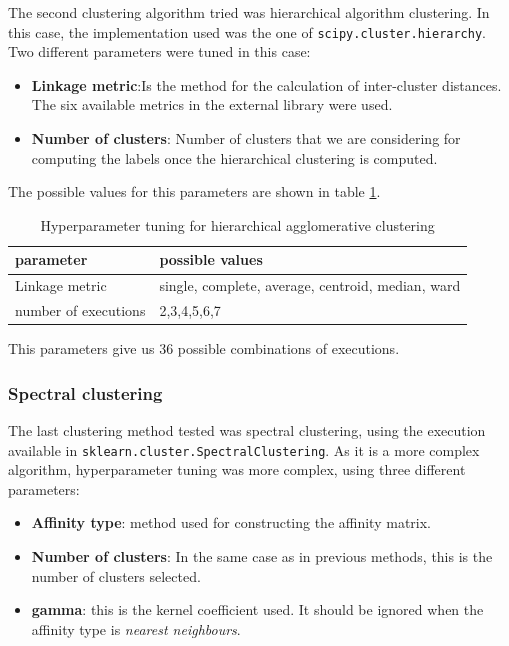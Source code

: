 \documentclass[12pt]{article}
\begin{document}
The second clustering algorithm tried was hierarchical algorithm clustering. In this case, the implementation used was the one of \texttt{scipy.cluster.hierarchy}. Two different parameters were tuned in this case:

\begin{itemize}
    \item \textbf{Linkage metric}:Is the method for the calculation of inter-cluster distances. The six available metrics in the external library were used.
    \item \textbf{Number of clusters}: Number of clusters that we are considering for computing the labels once the hierarchical clustering is computed.
\end{itemize}

The possible values for this parameters are shown in table \ref{table:hyp-hier}.

\begin{table}[h]
\centering
\begin{tabular}{l|l}
parameter            & possible values                                   \\ \hline
Linkage metric       & single, complete, average, centroid, median, ward \\
number of executions & 2,3,4,5,6,7                                      
\end{tabular}
\caption{Hyperparameter tuning for hierarchical agglomerative clustering}
\label{table:hyp-hier}
\end{table}

This parameters give us 36 possible combinations of executions.

\subsubsection{Spectral clustering}

The last clustering method tested was spectral clustering, using the execution available in \texttt{sklearn.cluster.SpectralClustering}. As it is a more complex algorithm, hyperparameter tuning was more complex, using three different parameters:

\begin{itemize}
    \item \textbf{Affinity type}: method used for constructing the affinity matrix.
    \item \textbf{Number of clusters}: In the same case as in previous methods, this is the number of clusters selected.
    \item \textbf{gamma}: this is the kernel coefficient used. It should be ignored when the affinity type is \textit{nearest neighbours}.
\end{itemize}
\end{document}
